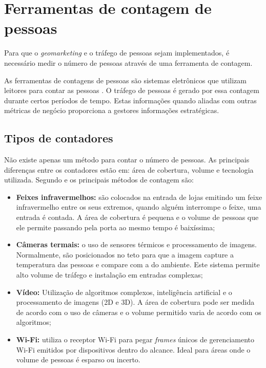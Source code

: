 \section{Ferramentas de contagem de pessoas}
Para que o \emph{geomarketing} e o tráfego de pessoas sejam implementados, é necessário medir o número
de pessoas através de uma ferramenta de contagem.

As ferramentas de contagens de pessoas
são sistemas eletrônicos que utilizam leitores para contar as pessoas
\cite{trafsysdef}. O tráfego de pessoas é gerado por essa contagem durante
certos períodos de tempo. Estas informações quando aliadas com outras métricas de
negócio proporciona a gestores informações estratégicas.

\subsection{Tipos de contadores}
Não existe apenas um método para contar o número de pessoas. As principais
diferenças entre os contadores estão em: área de cobertura, volume e tecnologia
utilizada. Segundo  e  os principais métodos de
contagem são:

\begin{itemize}
  \item \textbf{Feixes infravermelhos:} são colocados
na entrada de lojas emitindo um feixe infravermelho entre os seus extremos,
quando alguém interrompe o feixe, uma entrada é contada. A área de cobertura é
pequena e o volume de pessoas que ele permite passando pela porta ao mesmo
tempo é baixíssima;
  \item \textbf{Câmeras termais:} o uso de sensores térmicos e
processamento de imagens. Normalmente,
são posicionados no teto para que a imagem capture a temperatura das pessoas
e compare com a do ambiente. Este sistema permite alto volume de tráfego e instalação em entradas complexas;
  \item \textbf{Vídeo:} Utilização de algoritmos complexos, inteligência artificial
   e o processamento de imagens (2D e 3D). A área de cobertura
  pode ser medida de acordo com o uso de câmeras e o volume permitido varia de acordo com os algoritmos;
  \item \textbf{Wi-Fi:} utiliza o receptor Wi-Fi para pegar \emph{frames} únicos de gerenciamento Wi-Fi emitidos por dispositivos
  dentro do alcance. Ideal para áreas onde o volume de pessoas é esparso ou incerto.
\end{itemize}

